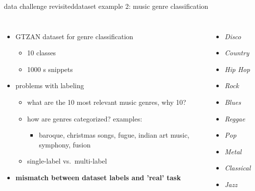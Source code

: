 \begin{frame}{data challenge revisited}{dataset example 2: music genre classification}
    \vspace{-5mm}
    \begin{columns}
    \begin{itemize}
        \item	GTZAN dataset for genre classification
            \begin{itemize}
                \item   10 classes
                \item   1000 \unit[30]{s} snippets
            \end{itemize}
        \bigskip
        \item<2->	problems with labeling
            \begin{itemize}
                \item   what are the 10 most relevant music genres, why 10?
                \item	how are genres categorized? examples:
                    \begin{itemize}
                        \item baroque, christmas songs, fugue, indian art music, symphony, fusion
                    \end{itemize}
                \item  single-label vs.\ multi-label
            \end{itemize}
        \bigskip
        \item<3->[$\Rightarrow$] \textbf{mismatch between dataset labels and 'real' task}
    \end{itemize}
    \begin{itemize}
        \item[] \textit{Disco}
		\item[] \textit{Country}
		\item[] \textit{Hip Hop}
		\item[] \textit{Rock}
        \item[] \textit{Blues}
        \item[] \textit{Reggae}
        \item[] \textit{Pop}
        \item[] \textit{Metal}
        \item[] \textit{Classical}
        \item[] \textit{Jazz}
    \end{itemize}
    \end{columns}
\end{frame}

